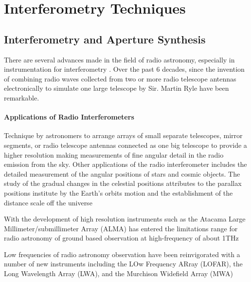 \chapter{Interferometry Techniques}
\label{Chapter6}

\large {
\section*{Interferometry and Aperture Synthesis}
 
  There are several advances made in the field of radio astronomy, especially in instrumentation for interferometry \cite{richard2017interferometry}.
  Over the past 6 decades, since the invention of combining radio waves collected from two or more radio telescope antennas  electronically to simulate one large telescope by Sir. Martin Ryle %
  have been remarkable.

 \subsubsection{ Applications of Radio Interferometers}
  Technique by astronomers to arrange arrays of small separate telescopes, mirror segments, or radio telescope antennas connected as one big telescope to provide a higher resolution making  measurements of fine angular detail in the radio emission from the sky.
  Other applications of the radio interferometer includes the detailed measurement of the angular positions of stars and cosmic objects. The study of the gradual changes in the celestial positions attributes to the parallax positions institute by the Earth's orbits motion and the establishment of the distance scale off the universe %

 With the development of high resolution instruments such as the Atacama Large Millimeter/submillimeter Array (ALMA) has entered the limitations range for radio astronomy of ground based observation at high-frequency of about 1THz %
  
  Low frequencies of radio astronomy observation have been reinvigorated with a number of new instruments  including the LOw Frequency ARray (LOFAR), the Long Wavelength Array (LWA), and the Murchison Widefield Array (MWA)
  
  

}
